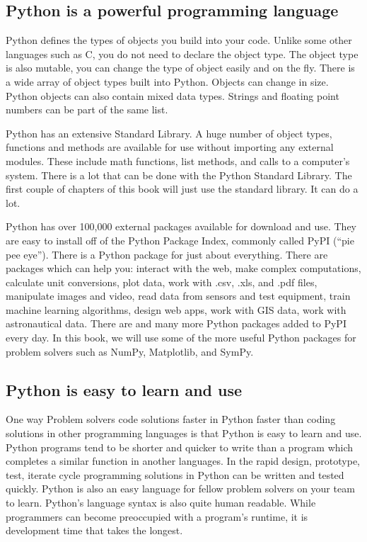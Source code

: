 \documentclass{book}
\begin{document}
    
        \subsection{Python is a powerful programming
language}\label{python-is-a-powerful-programming-language}

Python defines the types of objects you build into your code. Unlike
some other languages such as C, you do not need to declare the object
type. The object type is also mutable, you can change the type of object
easily and on the fly. There is a wide array of object types built into
Python. Objects can change in size. Python objects can also contain
mixed data types. Strings and floating point numbers can be part of the
same list.

Python has an extensive Standard Library. A huge number of object types,
functions and methods are available for use without importing any
external modules. These include math functions, list methods, and calls
to a computer's system. There is a lot that can be done with the Python
Standard Library. The first couple of chapters of this book will just
use the standard library. It can do a lot.

Python has over 100,000 external packages available for download and
use. They are easy to install off of the Python Package Index, commonly
called PyPI (``pie pee eye''). There is a Python package for just about
everything. There are packages which can help you: interact with the
web, make complex computations, calculate unit conversions, plot data,
work with .csv, .xls, and .pdf files, manipulate images and video, read
data from sensors and test equipment, train machine learning algorithms,
design web apps, work with GIS data, work with astronautical data. There
are and many more Python packages added to PyPI every day. In this book,
we will use some of the more useful Python packages for problem solvers
such as NumPy, Matplotlib, and SymPy.
    




    
        \subsection{Python is easy to learn and
use}\label{python-is-easy-to-learn-and-use}

One way Problem solvers code solutions faster in Python faster than
coding solutions in other programming languages is that Python is easy
to learn and use. Python programs tend to be shorter and quicker to
write than a program which completes a similar function in another
languages. In the rapid design, prototype, test, iterate cycle
programming solutions in Python can be written and tested quickly.
Python is also an easy language for fellow problem solvers on your team
to learn. Python's language syntax is also quite human readable. While
programmers can become preoccupied with a program's runtime, it is
development time that takes the longest.
\end{document}

